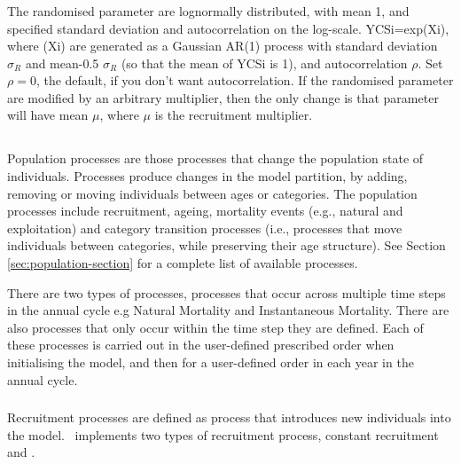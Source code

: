 \subsubsection*{}
The randomised parameter are lognormally distributed, with mean 1, and specified standard deviation and autocorrelation on the log-scale. YCSi=exp(Xi), where (Xi) are generated as a Gaussian AR(1) process with standard deviation $\sigma_R$ and mean-0.5 $\sigma_R$ (so that the mean of YCSi is 1), and autocorrelation $\rho$. Set $\rho=0$, the default, if you don’t want autocorrelation. If the randomised parameter are modified by an arbitrary multiplier, then the only change is that parameter will have mean $\mu$, where $\mu$ is the recruitment multiplier.

\subsection{}
\CH
Population processes are those processes that change the population state of individuals. Processes produce changes in the model partition, by adding, removing or moving individuals between ages or categories. The population processes include recruitment, ageing,  mortality events (e.g., natural and exploitation) and category transition processes (i.e., processes that move individuals between categories, while preserving their age structure). See Section \ref{sec:population-section} for a complete list of available processes.

There are two types of processes, processes that occur across multiple time steps in the annual cycle e.g Natural Mortality and Instantaneous Mortality. There are also processes that only occur within the time step they are defined. Each of these processes is carried out in the user-defined prescribed order when initialising the model, and then for a user-defined order in each year in the annual cycle. 

\subsubsection{}
\CH
Recruitment processes are defined as  process that introduces new individuals into the model. \CNAME\ implements two types of recruitment process, constant recruitment and   \citep{1203}.

